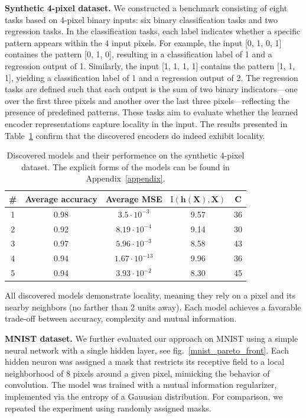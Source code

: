\documentclass[14pt]{extarticle}
\begin{document}
        \textbf{Synthetic 4-pixel dataset.}
        We constructed a benchmark consisting of eight tasks based on 4-pixel binary inputs: six binary classification tasks and two regression tasks. In the classification tasks, each label indicates whether a specific pattern appears within the 4 input pixels. For example, the input [0, 1, 0, 1] containes the pattern [0, 1, 0], resulting in a classification label of 1 and a regression output of 1. Similarly, the input [1, 1, 1, 1] contains the pattern [1, 1, 1], yielding a classification label of 1 and a regression output of 2. The regression tasks are defined such that each output is the sum of two binary indicators---one over the first three pixels and another over the last three pixels---reflecting the presence of predefined patterns. These tasks aim to evaluate whether the learned encoder representations capture locality in the input. The results presented in Table~\ref{4-pixels} confirm that the discovered encoders do indeed exhibit locality.\\
        \begin{table}[ht!]
            \centering
            \begin{tabular}{|c|c|c|c|c|}
                \hline
                 \# & Average accuracy & Average MSE  & \(\operatorname{I(\mathbf{h}(\mathbf{X}), \mathbf{X})}\) & C \\ \hline 
                 1 & 0.98 & \(3.5 \cdot 10^{-3}\) & 9.57 & 36 \\
                 2 & 0.92 & \(8.19 \cdot 10^{-4}\) & 9.14 & 30 \\
                 3 & 0.97 & \(5.96 \cdot 10^{-3}\) & 8.58 & 43 \\
                 4 & 0.94 & \(1.67 \cdot 10^{-13}\) & 9.96 & 36 \\
                 5 & 0.94 & \(3.93 \cdot 10^{-2}\) & 8.30 & 45 \\ \hline
            \end{tabular}
            \caption{Discovered models and their performence on the synthetic 4-pixel dataset. The explicit forms of the models can be found in Appendix~\ref{appendix}.}
            \label{4-pixels}
        \end{table}
        All discovered models demonstrate locality, meaning they rely on a pixel and its nearby neighbors (no farther than 2 units away). Each model achieves a favorable trade-off between accuracy, complexity and mutual information.
        

        \textbf{MNIST dataset.} 
        We further evaluated our approach on MNIST using a simple neural network with a single hidden layer, see fig.~\ref{mnist_pareto_front}. Each hidden neuron was assigned a mask that restricts its receptive field to a local neighborhood of 8 pixels around a given pixel, mimicking the behavior of convolution. The model was trained with a mutual information regularizer, implemented via the entropy of a Gauusian distribution. For comparison, we repeated the experiment using randomly assigned masks. 
        
\end{document}
